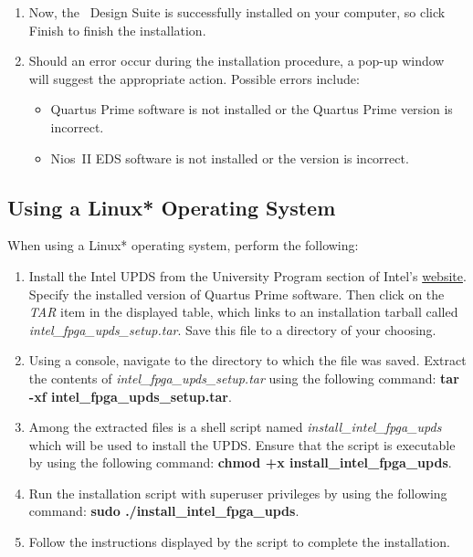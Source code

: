 \documentclass[11pt, twoside, pdftex]{article}
\begin{document}
\begin{enumerate}
\item Now, the \teamname ~Design Suite is successfully installed on your computer, so click {\sf Finish} to
finish the installation.

\item Should an error occur during the installation procedure, a pop-up window will suggest the appropriate action. 
Possible errors include:
\begin{itemize}
\item Quartus Prime software is not installed or the Quartus Prime
version is incorrect.
\item Nios~II EDS software is not installed or the version is
incorrect.
\end{itemize}
\end{enumerate}

\subsection{Using a Linux* Operating System}
\label{sec:2.2}

When using a Linux* operating system, perform the following:

\begin{enumerate} 
\item Install the Intel UPDS from the University Program section of Intel's \href{https://www.intel.com/content/www/us/en/programmable/support/training/university/materials-software.html}{website}.
Specify the installed version of Quartus Prime software.
Then click on the {\it TAR} item in the displayed table, 
which links to an installation tarball called 
{\it intel\_fpga\_upds\_setup.tar}. 
Save this file to a directory of your choosing.

\item Using a console, navigate to the directory to which the
file was saved. Extract the contents of 
{\it intel\_fpga\_upds\_setup.tar} using the following command: 
{\bf tar -xf intel\_fpga\_upds\_setup.tar}.

\item Among the extracted files is a shell script named
{\it install\_intel\_fpga\_upds} which will be used to install the
UPDS. Ensure that the script is executable by using the following
command: {\bf chmod +x install\_intel\_fpga\_upds}. 

\item Run the installation script with superuser privileges by
using the following command: 
{\bf sudo ./install\_intel\_fpga\_upds}.

\item Follow the instructions displayed by the script to complete
the installation.

\end{enumerate}
\end{document}
